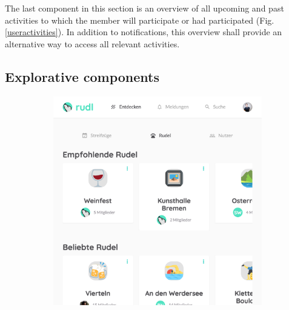 \documentclass[12pt,numbers=noenddot,parskip,bibliography=totocnumbered,listof=totocnumbered,draft]{scrreprt}
\begin{document}
The last component in this section is an overview of all upcoming and past activities to which the member will participate or had participated (Fig. \ref{useractivities}). In addition to notifications, this overview shall provide an alternative way to access all relevant activities.

\subsection{Explorative components}
\begin{figure}
\begin{subfigure}[t]{0.45\textwidth}%
\centering
\includegraphics[width=\linewidth]{exploreinterestgroups.png}
\caption{}
\label{exploreinterestgroups}
\end{subfigure}%
\hfill
\begin{subfigure}[t]{0.45\textwidth}%
\centering

\end{subfigure}
\end{figure}
\end{document}
